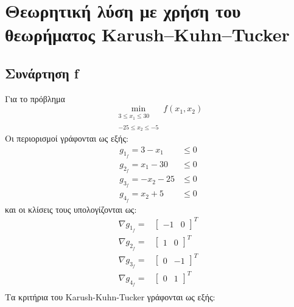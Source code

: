 \chapter{Θεωρητική λύση με χρήση του θεωρήματος Karush–Kuhn–Tucker} \label{part_a}

\section{Συνάρτηση f}

Για το πρόβλημα
\begin{equation}
	\label{eq:f-problem}
	\min_{
		\substack{3 \leq x_1 \leq 30 \\\\ -25 \leq x_2 \leq -5}
		}
	f(x_1, x_2)
\end{equation}
Οι περιορισμοί γράφονται ως εξής:
\begin{align*}
	g_{1_f} = 3 - x_1 &\leq 0\\
	g_{2_f} = x_1 - 30 &\leq 0\\
	g_{3_f} = -x_2 -25 &\leq 0\\
	g_{4_f} = x_2 + 5 &\leq 0
\end{align*}
και οι κλίσεις τους υπολογίζονται ως:
\begin{align*}
	\nabla g_{1_f} =& 
		\begin{bmatrix}
			-1& 0
		\end{bmatrix}^T\\
	\nabla g_{2_f} =& 
		\begin{bmatrix}
			1& 0
		\end{bmatrix}^T\\
	\nabla g_{3_f} =& 
		\begin{bmatrix}
			0& -1
		\end{bmatrix}^T\\
	\nabla g_{4_f} =& 
		\begin{bmatrix}
			0& 1
		\end{bmatrix}^T\\
\end{align*}
Τα κριτήρια του Karush-Kuhn-Tucker γράφονται ως εξής:
